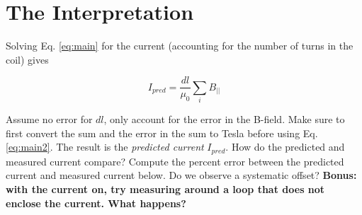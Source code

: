 \documentclass[12pt]{article}
\begin{document}
\section{The Interpretation}

Solving Eq. \ref{eq:main} for the current (accounting for the number of turns in the coil) gives

\begin{equation}
I_{pred} = \frac{dl}{\mu_0} \sum_i B_{||} \label{eq:main2}
\end{equation}

Assume no error for $dl$, only account for the error in the B-field.  Make sure to first convert the sum and the error in the sum to Tesla before using Eq. \ref{eq:main2}.  The result is the \textit{predicted current} $I_{pred}$.  How do the predicted and measured current compare?  Compute the percent error between the predicted current and measured current below.  Do we observe a systematic offset? \textbf{Bonus: with the current on, try measuring around a loop that does not enclose the current.  What happens?} \\ \vspace{7cm}
\end{document}

